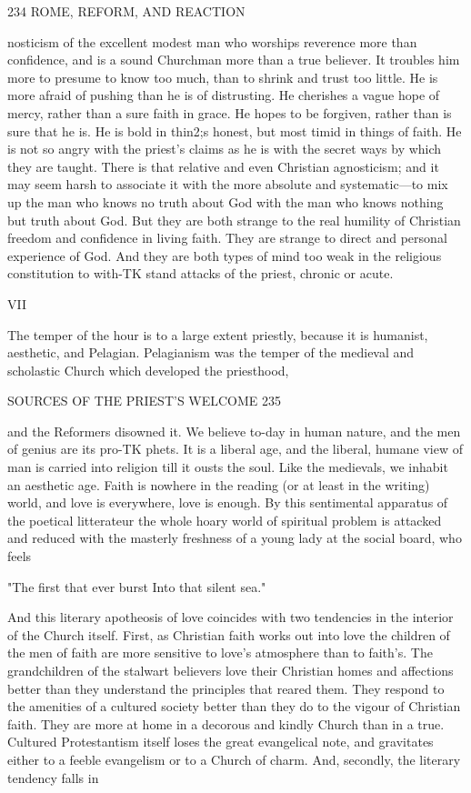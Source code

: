 \documentclass[12pt,a5paper,twoside]{book}
\begin{document}
{234 ROME, REFORM, AND REACTION 

nosticism of the excellent modest man who worships 
reverence more than confidence, and is a sound 
Churchman more than a true believer. It troubles him 
more to presume to know too much, than to shrink and 
trust too little. He is more afraid of pushing than he 
is of distrusting. He cherishes a vague hope of mercy, 
rather than a sure faith in grace. He hopes to be 
forgiven, rather than is sure that he is. He is bold in 
thin2;s honest, but most timid in things of faith. He 
is not so angry with the priest's claims as he is with 
the secret ways by which they are taught. There 
is that relative and even Christian agnosticism; and it 
may seem harsh to associate it with the more absolute 
and systematic---to mix up the man who knows no 
truth about God with the man who knows nothing but 
truth about God. But they are both strange to the 
real humility of Christian freedom and confidence in 
living faith. They are strange to direct and personal 
experience of God. And they are both types of 
mind too weak in the religious constitution to with-TK
stand attacks of the priest, chronic or acute. 

VII 

The temper of the hour is to a large extent priestly, 
because it is humanist, aesthetic, and Pelagian. 
Pelagianism was the temper of the medieval and 
scholastic Church which developed the priesthood, 



SOURCES OF THE PRIEST'S WELCOME 235 

and the Reformers disowned it. We believe to-day 
in human nature, and the men of genius are its pro-TK
phets. It is a liberal age, and the liberal, humane 
view of man is carried into religion till it ousts the 
soul. Like the medievals, we inhabit an aesthetic 
age. Faith is nowhere in the reading (or at least in 
the writing) world, and love is everywhere, love is 
enough. By this sentimental apparatus of the poetical 
litterateur the whole hoary world of spiritual problem 
is attacked and reduced with the masterly freshness 
of a young lady at the social board, who feels 

"The first that ever burst 
Into that silent sea." 

And this literary apotheosis of love coincides with two 
tendencies in the interior of the Church itself. First, 
as Christian faith works out into love the children of the 
men of faith are more sensitive to love's atmosphere 
than to faith's. The grandchildren of the stalwart 
believers love their Christian homes and affections 
better than they understand the principles that reared 
them. They respond to the amenities of a cultured 
society better than they do to the vigour of Christian 
faith. They are more at home in a decorous and 
kindly Church than in a true. Cultured Protestantism 
itself loses the great evangelical note, and gravitates 
either to a feeble evangelism or to a Church of 
charm. And, secondly, the literary tendency falls in 



}
\end{document}
